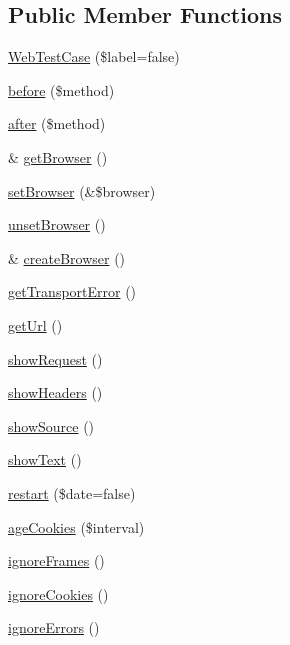 \subsection*{Public Member Functions}
\begin{DoxyCompactItemize}
\item 
\hyperlink{class_web_test_case_af4f14d8dd0bc743ea15308261b859f50}{WebTestCase} (\$label=false)
\item 
\hyperlink{class_web_test_case_a87f5e5088a08ea1b2588c3fcfdb2ead3}{before} (\$method)
\item 
\hyperlink{class_web_test_case_ab29c41a37c83f0a4a230f81dcee4dcbf}{after} (\$method)
\item 
\& \hyperlink{class_web_test_case_ad7ef0640edd1ef69ee201cb661ed5935}{getBrowser} ()
\item 
\hyperlink{class_web_test_case_a6a7359c09fc9665e5d34c2c69068134f}{setBrowser} (\&\$browser)
\item 
\hyperlink{class_web_test_case_a7ed6a5b76724d578d6f66a15945651ab}{unsetBrowser} ()
\item 
\& \hyperlink{class_web_test_case_a004842238df312f4fd8d10da0631bbfd}{createBrowser} ()
\item 
\hyperlink{class_web_test_case_ac12566754888b2e6e3cee8290c2df04d}{getTransportError} ()
\item 
\hyperlink{class_web_test_case_aff8c47b2f6380af648711b8fbf82667e}{getUrl} ()
\item 
\hyperlink{class_web_test_case_ade23ffdc160a37580518c0afc3657aa2}{showRequest} ()
\item 
\hyperlink{class_web_test_case_a9cb4dfc25c77a145504e46b8eb3acd5d}{showHeaders} ()
\item 
\hyperlink{class_web_test_case_a01442fb03a6a4e700e0eb22c79aaec98}{showSource} ()
\item 
\hyperlink{class_web_test_case_a7060ba1f005664015384f1280fb8c9a3}{showText} ()
\item 
\hyperlink{class_web_test_case_a7c3811b06a5a25b08baabe63599ac6e6}{restart} (\$date=false)
\item 
\hyperlink{class_web_test_case_a1f28c1af59fd3c2c4c9a2d837c089f7a}{ageCookies} (\$interval)
\item 
\hyperlink{class_web_test_case_a3fb48ba6173cf132a26a3695f2e43df3}{ignoreFrames} ()
\item 
\hyperlink{class_web_test_case_a0f36074331d50bcc7ea4bfe1c522f130}{ignoreCookies} ()
\item 
\hyperlink{class_web_test_case_a6aface34c4d09b7340bda88c72468056}{ignoreErrors} ()

\end{DoxyCompactItemize}
